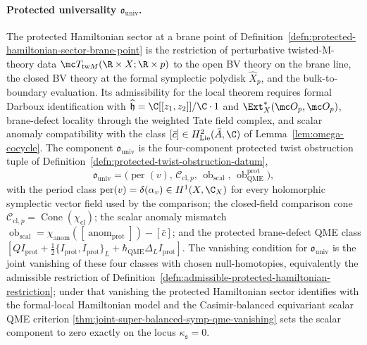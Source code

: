 \documentclass[11pt]{memoir}
\begin{document}
\paragraph{\texorpdfstring{Protected universality \(\mathfrak o_{\mathrm{univ}}\).}{Protected universality o-univ.}}
The protected Hamiltonian sector at a brane point of
Definition~\ref{defn:protected-hamiltonian-sector-brane-point} is the
restriction of perturbative twisted-M-theory data
\(\mc T_{\mathrm{tw}M}(\R\times X;\R\times p)\) to the open BV theory on
the brane line, the closed BV theory at the formal symplectic polydisk
\(\widehat X_p\), and the bulk-to-boundary evaluation.  Its
admissibility for the local theorem requires formal Darboux
identification with \(\widehat{\mathfrak h}=\C[[z_1,z_2]]/\C\cdot1\) and
\(\Ext^*_X(\mc O_p,\mc O_p)\), brane-defect locality through the
weighted Tate field complex, and scalar anomaly compatibility with the
class \([\bar c]\in H^2_{\mathrm{Lie}}(\bar A,\C)\) of
Lemma~\ref{lem:omega-cocycle}.  The component
\(\mathfrak o_{\mathrm{univ}}\) is the four-component protected twist
obstruction tuple of
Definition~\ref{defn:protected-twist-obstruction-datum},
\[
  \mathfrak o_{\mathrm{univ}}
    =
    \bigl(
      \operatorname{per}(v),\,
      \mathcal C_{\mathrm{cl},p},\,
      \operatorname{ob}_{\mathrm{scal}},\,
      \operatorname{ob}_{\mathrm{QME}}^{\mathrm{prot}}
    \bigr),
\]
with the period class
\(\operatorname{per}(v)=\delta(\alpha_v)\in H^1(X,\C_X)\) for every
holomorphic symplectic vector field used by the comparison; the
closed-field comparison cone
\(\mathcal C_{\mathrm{cl},p}=
\operatorname{Cone}(\chi_{\mathrm{cl}})\); the scalar anomaly mismatch
\(\operatorname{ob}_{\mathrm{scal}}=
\chi_{\mathrm{anom}}([\operatorname{anom}_{\mathrm{prot}}])-[\bar c]\);
and the protected brane-defect QME class
\([QI_{\mathrm{prot}}+\frac12\{I_{\mathrm{prot}},I_{\mathrm{prot}}\}_L+
\hbar_{\mathrm{QME}}\Delta_L I_{\mathrm{prot}}]\).  The vanishing condition for
\(\mathfrak o_{\mathrm{univ}}\) is the joint vanishing of these four
classes with chosen null-homotopies, equivalently the admissible
restriction of
Definition~\ref{defn:admissible-protected-hamiltonian-restriction};
under that vanishing the protected Hamiltonian sector identifies with
the formal-local Hamiltonian model and the Casimir-balanced equivariant
scalar QME criterion \ref{thm:joint-super-balanced-symp-qme-vanishing}
sets the scalar component to zero exactly on the locus
\(\kappa_{\mathfrak s}=0\).


\end{document}
